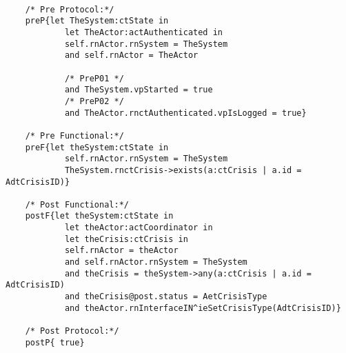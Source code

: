 	\scriptsize
	\vspace{0.5cm}
	\begin{lstlisting}[style=MessirStyle,firstnumber=auto,captionpos=b,caption={\msrmessir (MCL-oriented) specification of the operation \emph{oeSetCrisisType}.},label=OM-actCoordinator-oeSetCrisisType-MCL-LST]

	/* Pre Protocol:*/ 
	preP{let TheSystem:ctState in
	  		let TheActor:actAuthenticated in
	  		self.rnActor.rnSystem = TheSystem
	  		and self.rnActor = TheActor
	  
			/* PreP01 */
	  		and TheSystem.vpStarted = true
			/* PreP02 */
	  		and TheActor.rnctAuthenticated.vpIsLogged = true}
	
	/* Pre Functional:*/
	preF{let theSystem:ctState in
			self.rnActor.rnSystem = TheSystem
			TheSystem.rnctCrisis->exists(a:ctCrisis | a.id = AdtCrisisID)}
	
	/* Post Functional:*/ 
	postF{let theSystem:ctState in
			let theActor:actCoordinator in
			let theCrisis:ctCrisis in
			self.rnActor = theActor 
			and	self.rnActor.rnSystem = TheSystem
			and theCrisis = theSystem->any(a:ctCrisis | a.id = AdtCrisisID)
			and theCrisis@post.status = AetCrisisType
			and theActor.rnInterfaceIN^ieSetCrisisType(AdtCrisisID)}
	
	/* Post Protocol:*/ 
	postP{ true}
	
	\end{lstlisting}
	\normalsize 
	
	
	
	





